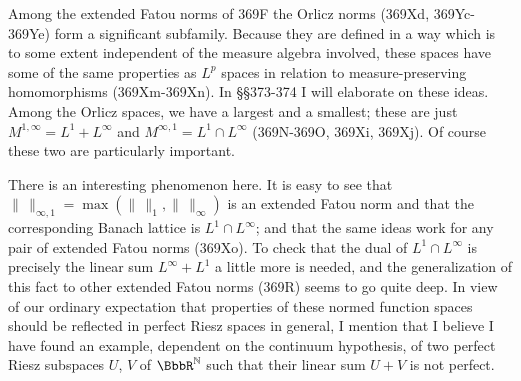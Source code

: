 {Among the extended Fatou norms of 369F the Orlicz norms (369Xd,
369Yc-369Ye) form a
significant subfamily.   Because they are defined in a way which is to
some extent independent of the measure algebra involved, these spaces
have some of the same properties as $L^p$ spaces in relation to
measure-preserving homomorphisms (369Xm-369Xn).   In \S\S373-374 I will
elaborate on these ideas.   Among the Orlicz spaces, we have a
largest and a smallest;  these are just $M^{1,\infty}=L^1+L^{\infty}$
and $M^{\infty,1}=L^1\cap L^{\infty}$ (369N-369O, 369Xi, 369Xj).   Of
course these two are particularly important.
     
There is an interesting phenomenon here.   It is easy to see that
$\|\,\|_{\infty,1}=\max(\|\,\|_1,\|\,\|_{\infty})$ is an extended Fatou
norm and that the corresponding Banach lattice is $L^1\cap L^{\infty}$;
and that the same ideas work for any pair of extended Fatou norms
(369Xo).   To check that the dual of $L^1\cap L^{\infty}$ is precisely
the linear sum $L^{\infty}+L^1$ a little more is needed, and the
generalization of this fact to other extended Fatou norms (369R) seems
to go quite deep.   In view of our ordinary expectation that properties
of these normed function spaces should be reflected in perfect Riesz
spaces in general, I mention that I believe I have found an example,
dependent on the continuum hypothesis, of
two perfect Riesz subspaces $U$, $V$ of $\BbbR^{\Bbb N}$ such that
their linear sum $U+V$ is not perfect.
}%
     
\frnewpage

